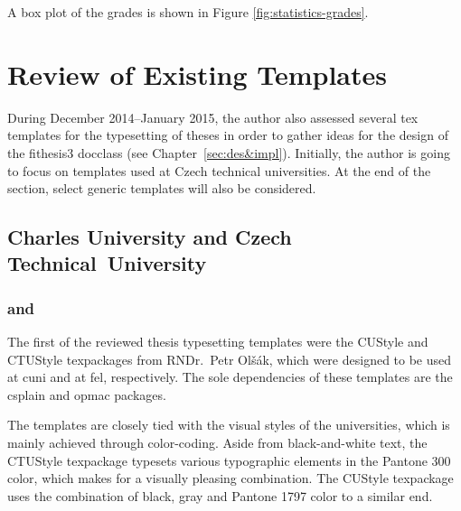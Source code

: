 \documentclass[12pt,twoside,color,table]%
  {fithesis3/fithesis3} %
\begin{document}
  A box plot of the grades is shown in Figure
  \ref{fig:statistics-grades}.

\chapter{Review of Existing Templates}\label{sec:review}
During December 2014--January 2015, the author also assessed
several \gls{tex} templates for the typesetting of theses in order
to gather ideas for the design of the \textsf{fithesis3}
\gls{docclass} (see Chapter~\ref{sec:des&impl}). Initially, the
author is going to focus on templates used at Czech technical
universities. At the end of the section, select generic templates
will also be considered.

  \section{Charles University and Czech Technical~University}
  \subsection{ and }
  \label{sec:ctu&custyle}
  The first of the reviewed thesis typesetting templates were the
  \textsf{CUStyle} \cite{custyle} and \textsf{CTUStyle}
  \cite{ctustyle} \glspl{texpackage} from RNDr.\ Petr Olšák,
  which were designed to be used at \gls{cuni} and at \gls{fel},
  respectively. The sole dependencies of these templates are the
  \gls{csplain} and \gls{opmac} packages.

  The templates are closely tied with the visual styles of the
  universities, which is mainly achieved through color-coding.
  Aside from black-and-white text, the \textsf{CTUStyle}
  \gls{texpackage} typesets various typographic elements in the
   Pantone 300 color, which makes for a
  visually pleasing combination. The \textsf{CUStyle}
  \gls{texpackage} uses the combination of black, gray and
   Pantone 1797 color to a similar end. 
\end{document}
